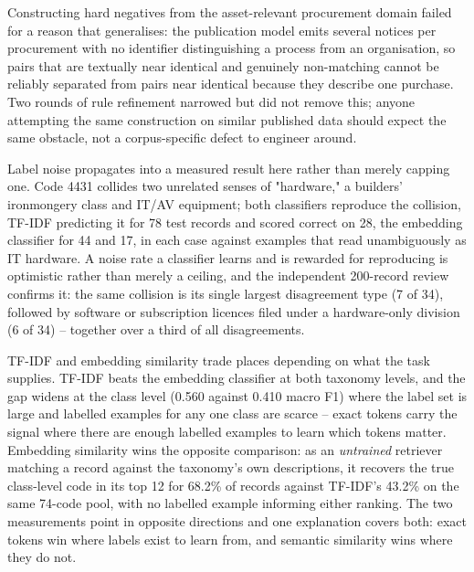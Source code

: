 \documentclass[conference]{IEEEtran}
\begin{document}
Constructing hard negatives from the asset-relevant procurement domain
failed for a reason that generalises: the publication model emits
several notices per procurement with no identifier distinguishing a
process from an organisation, so pairs that are textually near
identical and genuinely non-matching cannot be reliably separated from
pairs near identical because they describe one purchase. Two rounds of
rule refinement narrowed but did not remove this; anyone attempting
the same construction on similar published data should expect the
same obstacle, not a corpus-specific defect to engineer around.

Label noise propagates into a measured result here rather than merely
capping one. Code 4431 collides two unrelated senses of "hardware," a
builders' ironmongery class and IT/AV equipment; both classifiers
reproduce the collision, TF-IDF predicting it for 78 test records and
scored correct on 28, the embedding classifier for 44 and 17, in each
case against examples that read unambiguously as IT hardware. A noise
rate a classifier learns and is rewarded for reproducing is optimistic
rather than merely a ceiling, and the independent 200-record review
confirms it: the same collision is its single largest disagreement
type (7 of 34), followed by software or subscription licences filed
under a hardware-only division (6 of 34) -- together over a third of
all disagreements.

TF-IDF and embedding similarity trade places depending on what the task
supplies. TF-IDF beats the embedding classifier at both taxonomy
levels, and the gap widens at the class level (0.560 against 0.410
macro F1) where the label set is large and labelled examples for any
one class are scarce -- exact tokens carry the signal where there are
enough labelled examples to learn which tokens matter. Embedding
similarity wins the opposite comparison: as an \emph{untrained}
retriever matching a record against the taxonomy's own descriptions, it
recovers the true class-level code in its top 12 for 68.2\% of records
against TF-IDF's 43.2\% on the same 74-code pool, with no labelled
example informing either ranking. The two measurements point in
opposite directions and one explanation covers both: exact tokens win
where labels exist to learn from, and semantic similarity wins where
they do not.
\end{document}
